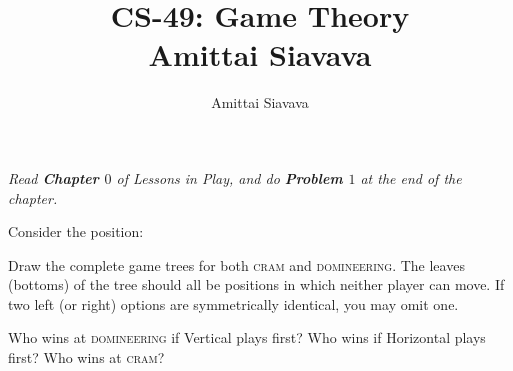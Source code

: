 \documentclass[11pt, reqno]{amsart}
\begin{document}

\title{CS-49: Game Theory\\ Amittai Siavava \\ }
\author{Amittai Siavava}


\setlength{\headheight}{13.0pt}
\setlength{\footskip}{15.0pt}

\maketitle

\begin{problem}[4]
  \emph{Read \textbf{Chapter $0$} of Lessons in Play, and do \textbf{Problem $1$} at the end of the chapter.}

  \step
  Consider the position:

  \begin{enumalph}
    \item Draw the complete game trees for both \textsc{cram}
      and \textsc{domineering}. The leaves (bottoms) of the tree
      should all be positions in which neither player can move.
      If two left (or right) options are symmetrically identical, you may omit one.

      \begin{figure}[H]
        
      \end{figure}

    \item Who wins at \textsc{domineering} if Vertical plays first?
      Who wins if Horizontal plays first? Who wins at \textsc{cram}?
  \end{enumalph}
\end{problem}
\end{document}
